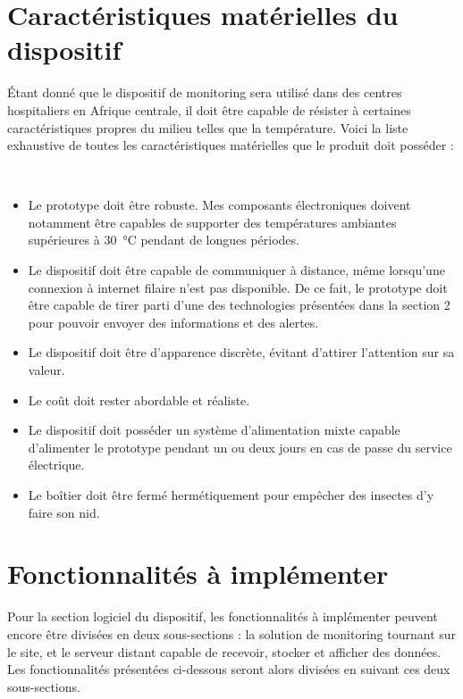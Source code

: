 \section{Caractéristiques matérielles du dispositif}
\label{sec:cahier_proto}

Étant donné que le dispositif de monitoring sera utilisé dans des centres hospitaliers en Afrique centrale, il doit être capable de résister à certaines caractéristiques propres du milieu telles que la température. Voici la liste exhaustive de toutes les caractéristiques matérielles que le produit doit posséder :

~


\begin{itemize}
  \item Le prototype doit être robuste. Mes composants électroniques doivent notamment être capables de supporter des températures ambiantes supérieures à \SI{30}{\celsius} pendant de longues périodes. \cite{temperature_kinshasa}

  \item Le dispositif doit être capable de communiquer à distance, même lorsqu'une connexion à internet filaire n'est pas disponible. De ce fait, le prototype doit être capable de tirer parti d'une des technologies présentées dans la section 2 pour pouvoir envoyer des informations et des alertes.

  \item Le dispositif doit être d'apparence discrète, évitant d'attirer l'attention sur sa valeur.

  \item Le coût doit rester abordable et réaliste.

  \item Le dispositif doit posséder un système d'alimentation mixte capable d'alimenter le prototype pendant un ou deux jours en cas de passe du service électrique.

  \item Le boîtier doit être fermé hermétiquement pour empêcher des insectes d'y faire son nid.
\end{itemize}



\section{Fonctionnalités à implémenter}
\label{sec:cahier_soft}

Pour la section logiciel du dispositif, les fonctionnalités à implémenter peuvent encore être divisées en deux sous-sections : la solution de monitoring tournant sur le site, et le serveur distant capable de recevoir, stocker et afficher des données. Les fonctionnalités présentées ci-dessous seront alors divisées en suivant ces deux sous-sections.

